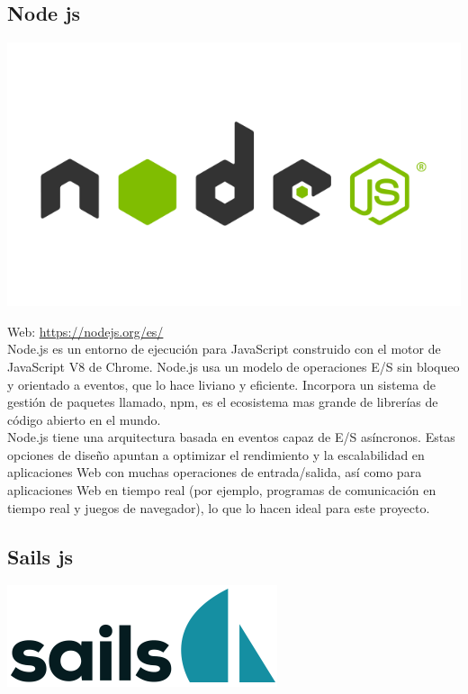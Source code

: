 \subsection{Node js}

\begin{center}
\includegraphics[scale=0.3]{imagenes/nodejs-logo.png}
\end{center}

Web: \url{https://nodejs.org/es/}\\

Node.js es un entorno de ejecución para JavaScript construido con el motor de JavaScript V8 de Chrome. Node.js usa un modelo de operaciones E/S sin bloqueo y orientado a eventos, que lo hace liviano y eficiente. Incorpora un sistema de gestión de paquetes llamado, npm, es el ecosistema mas grande de librerías de código abierto en el mundo.\\

Node.js tiene una arquitectura basada en eventos capaz de E/S asíncronos. Estas opciones de diseño apuntan a optimizar el rendimiento y la escalabilidad en aplicaciones Web con muchas operaciones de entrada/salida, así como para aplicaciones Web en tiempo real (por ejemplo, programas de comunicación en tiempo real y juegos de navegador), lo que lo hacen ideal para este proyecto.\\


\subsection{Sails js}

\begin{center}
\includegraphics[scale=0.3]{imagenes/sailsjs-logo.png}
\end{center}

